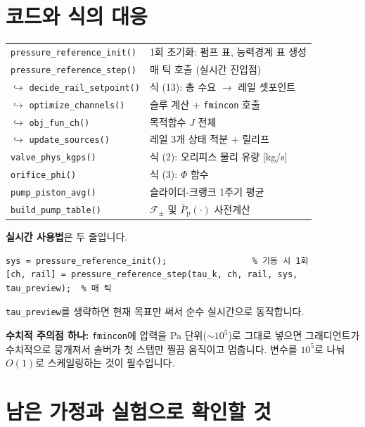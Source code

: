 \documentclass[11pt]{article}
\begin{document}
\clearpage
\section{코드와 식의 대응}

\begin{codebox}
\small
\begin{tabular}{@{}ll@{}}
\texttt{pressure\_reference\_init()} & 1회 초기화: 펌프 표, 능력경계 표 생성\\
\texttt{pressure\_reference\_step()} & 매 틱 호출 (실시간 진입점)\\[2mm]
\quad$\hookrightarrow$ \texttt{decide\_rail\_setpoint()} & 식 (13): 총 수요 $\to$ 레일 셋포인트\\
\quad$\hookrightarrow$ \texttt{optimize\_channels()} & 슬루 계산 + \texttt{fmincon} 호출\\
\quad\quad$\hookrightarrow$ \texttt{obj\_fun\_ch()} & 목적함수 $J$ 전체\\
\quad$\hookrightarrow$ \texttt{update\_sources()} & 레일 3개 상태 적분 + 릴리프\\[2mm]
\texttt{valve\_phys\_kgps()} & 식 (2): 오리피스 물리 유량 [kg/s]\\
\texttt{orifice\_phi()} & 식 (3): $\Phi$ 함수\\
\texttt{pump\_piston\_avg()} & 슬라이더-크랭크 1주기 평균\\
\texttt{build\_pump\_table()} & $\mathcal F_\pm$ 및 $\overline P_{\mathrm p}(\cdot)$ 사전계산\\
\end{tabular}
\end{codebox}

\textbf{실시간 사용법}은 두 줄입니다.
\begin{verbatim}
sys = pressure_reference_init();                 % 기동 시 1회
[ch, rail] = pressure_reference_step(tau_k, ch, rail, sys, tau_preview);  % 매 틱
\end{verbatim}
\texttt{tau\_preview}를 생략하면 현재 목표만 써서 순수 실시간으로 동작합니다.

\textbf{수치적 주의점 하나:} \texttt{fmincon}에 압력을 Pa 단위($\sim10^5$)로 그대로
넣으면 그래디언트가 수치적으로 뭉개져서 솔버가 첫 스텝만 찔끔 움직이고 멈춥니다.
변수를 $10^5$로 나눠 $O(1)$로 스케일링하는 것이 필수입니다.

\section{남은 가정과 실험으로 확인할 것}
\end{document}

